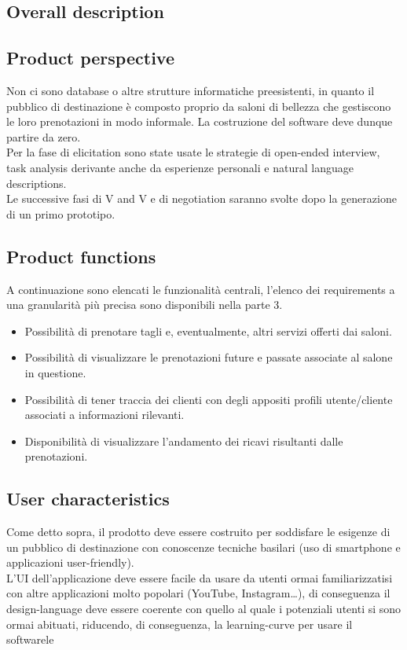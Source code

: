 \documentclass{article}
\begin{document}
\subsection {Overall description} 
\subsection {Product perspective} 
Non ci sono database o altre strutture informatiche preesistenti, in quanto il pubblico di destinazione è composto proprio da saloni di bellezza che gestiscono le loro prenotazioni in modo informale. La costruzione del software deve dunque partire da zero.
\\ Per la fase di elicitation sono state usate le strategie di open-ended interview, task analysis derivante anche da esperienze personali e natural language descriptions. 
\\ Le successive fasi di V and V e di negotiation saranno svolte dopo la generazione di un primo prototipo.
\subsection {Product functions} 
A continuazione sono elencati le funzionalità centrali, l’elenco dei requirements a una granularità più precisa sono disponibili nella parte 3.
\begin{itemize}
    \item Possibilità di prenotare tagli e, eventualmente, altri servizi offerti dai saloni.
    \item Possibilità di visualizzare le prenotazioni future e passate associate al salone in questione.
    \item Possibilità di tener traccia dei clienti con degli appositi profili utente/cliente associati a informazioni rilevanti.
    \item Disponibilità di visualizzare l’andamento dei ricavi risultanti dalle prenotazioni. 
\end{itemize}
\subsection {User characteristics} 
Come detto sopra, il prodotto deve essere costruito per soddisfare le esigenze di un pubblico di destinazione con conoscenze tecniche basilari (uso di smartphone e applicazioni user-friendly). 
\\L’UI dell’applicazione deve essere facile da usare da utenti ormai familiarizzatisi con altre applicazioni molto popolari (YouTube, Instagram…), di conseguenza il design-language deve essere coerente con quello al quale i potenziali utenti si sono ormai abituati, riducendo, di conseguenza, la learning-curve per usare il softwarele
\end{document}
